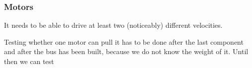 \subsubsection{Motors}

It needs to be able to drive at least two (noticeably) different velocities.

Testing whether one motor can pull it has to be done after the last component and after the bus has been built, because we do not know the weight of it. 
Until then we can test 

